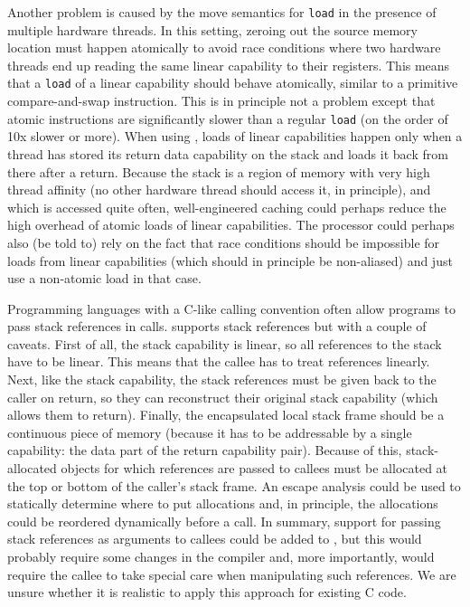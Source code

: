 Another problem is caused by the move semantics for \texttt{load} in the presence of multiple hardware threads.
In this setting, zeroing out the source memory location must happen atomically to avoid race conditions where two hardware threads end up reading the same linear capability to their registers.
This means that a \texttt{load} of a linear capability should behave atomically, similar to a primitive compare-and-swap instruction.
This is in principle not a problem except that atomic instructions are significantly slower than a regular \texttt{load} (on the order of 10x slower or more).
When using \stktokens{}, loads of linear capabilities happen only when a thread has stored its return data capability on the stack and loads it back from there after a return.
Because the stack is a region of memory with very high thread affinity (no other hardware thread should access it, in principle), and which is accessed quite often, well-engineered caching could perhaps reduce the high overhead of atomic loads of linear capabilities.
The processor could perhaps also (be told to) rely on the fact that race conditions should be impossible for loads from linear capabilities (which should in principle be non-aliased) and just use a non-atomic load in that case.


\begin{jversion}
  Programming languages with a C-like calling convention often allow programs to pass stack references in calls.
  \stktokens{} supports stack references but with a couple of caveats.
  First of all, the stack capability is linear, so all references to the stack have to be linear.
  This means that the callee has to treat references linearly.
  Next, like the stack capability, the stack references must be given back to the caller on return, so they can reconstruct their original stack capability (which allows them to return). 
  Finally, the encapsulated local stack frame should be a continuous piece of memory (because it has to be addressable by a single capability: the data part of the return capability pair).
  Because of this, stack-allocated objects for which references are passed to callees must be allocated at the top or bottom of the caller's stack frame.
  An escape analysis could be used to statically determine where to put allocations and, in principle, the allocations could be reordered dynamically before a call.
  In summary, support for passing stack references as arguments to callees could be added to \stktokens{}, but this would probably require some changes in the compiler and, more importantly, would require the callee to take special care when manipulating such references.
  We are unsure whether it is realistic to apply this approach for existing C code.
\end{jversion}

